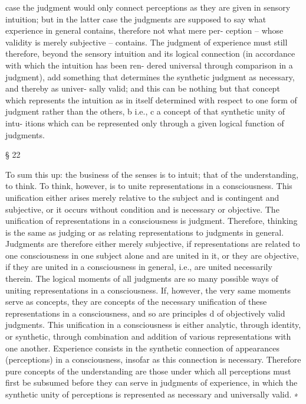 case the judgment would only connect perceptions as they are given in
sensory intuition; but in the latter case the judgments are supposed to
say what experience in general contains, therefore not what mere per-
ception – whose validity is merely subjective – contains. The judgment
of experience must still therefore, beyond the sensory intuition and its
logical connection (in accordance with which the intuition has been ren-
dered universal through comparison in a judgment), add something that
determines the synthetic judgment as necessary, and thereby as univer-
sally valid; and this can be nothing but that concept which represents the
intuition as in itself determined with respect to one form of judgment
rather than the others, b i.e., c a concept of that synthetic unity of intu-
itions which can be represented only through a given logical function of
judgments.

§ 22

To sum this up: the business of the senses is to intuit; that of the
understanding, to think. To think, however, is to unite representations
in a consciousness. This uniﬁcation either arises merely relative to the
subject and is contingent and subjective, or it occurs without condition
and is necessary or objective. The uniﬁcation of representations in a
consciousness is judgment. Therefore, thinking is the same as judging
or as relating representations to judgments in general. Judgments are
therefore either merely subjective, if representations are related to
one consciousness in one subject alone and are united in it, or they
are objective, if they are united in a consciousness in general, i.e., are
united necessarily therein. The logical moments of all judgments are
so many possible ways of uniting representations in a consciousness. If,
however, the very same moments serve as concepts, they are concepts
of the necessary uniﬁcation of these representations in a consciousness,
and so are principles d of objectively valid judgments. This uniﬁcation
in a consciousness is either analytic, through identity, or synthetic,
through combination and addition of various representations with one
another. Experience consists in the synthetic connection of appearances
(perceptions) in a consciousness, insofar as this connection is necessary.
Therefore pure concepts of the understanding are those under which all
perceptions must ﬁrst be subsumed before they can serve in judgments
of experience, in which the synthetic unity of perceptions is represented
as necessary and universally valid. ∗

